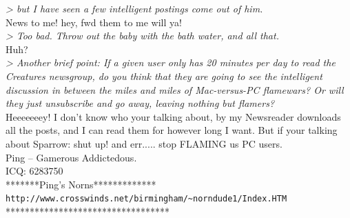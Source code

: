 \documentclass[11pt,twoside,a4paper]{article}
\begin{document}
\begin{multicols*}{2}
\emph{> but I have seen a few intelligent postings come out of him. }~\\

News to me! hey, fwd them to me will ya!~\\

\emph{> Too bad. Throw out the baby with the bath water, and all that. }~\\

Huh?~\\

\emph{> Another brief point: If a given user only has 20 minutes per day to read the Creatures newsgroup, do you think that they are going to see the intelligent discussion in between the miles and miles of Mac-versus-PC flamewars? Or will they just unsubscribe and go away, leaving nothing but flamers?}~\\

Heeeeeeey! I don't know who your talking about, by my Newsreader downloads all the posts, and I can read them for however long I want.  But if your talking about Sparrow: shut up! and err..... stop FLAMING us PC users.~\\

Ping -- Gamerous Addictedous.~\\
ICQ:  6283750~\\
*******Ping's Norns*************~\\
\texttt{http://www.crosswinds.net/birmingham/\textasciitilde norndude1/Index.HTM}~\\
********************************** ~\\

\end{multicols*}
\end{document}
